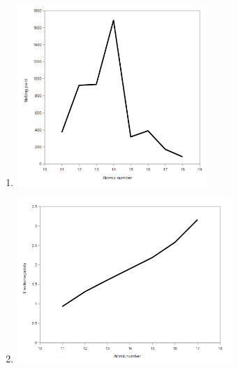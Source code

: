 \begin{multicols}{3}
\begin{enumerate}[itemsep=6pt, label=\textbf{\arabic*}. ]
\begin{enumerate}[noitemsep, label=\textbf{(\alph*)} ]
    \item \includegraphics[width=.2\textwidth]{photos/periodictable_eocex_graph3.png}
    \item \includegraphics[width=.2\textwidth]{photos/periodic_table_eocex_graph4.png}
    \end{enumerate}
\end{enumerate}
\end{multicols}

